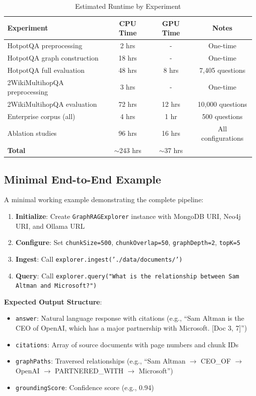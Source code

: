 \documentclass[conference]{IEEEtran}
\begin{document}
\begin{table}[H]
\caption{Estimated Runtime by Experiment}
\label{tab:runtime}
\centering
\begin{tabular}{lccc}
\toprule
\textbf{Experiment} & \textbf{CPU Time} & \textbf{GPU Time} & \textbf{Notes} \\
\midrule
HotpotQA preprocessing & 2 hrs & - & One-time \\
HotpotQA graph construction & 18 hrs & - & One-time \\
HotpotQA full evaluation & 48 hrs & 8 hrs & 7,405 questions \\
2WikiMultihopQA preprocessing & 3 hrs & - & One-time \\
2WikiMultihopQA evaluation & 72 hrs & 12 hrs & 10,000 questions \\
Enterprise corpus (all) & 4 hrs & 1 hr & 500 questions \\
Ablation studies & 96 hrs & 16 hrs & All configurations \\
\midrule
\textbf{Total} & $\sim$243 hrs & $\sim$37 hrs & \\
\bottomrule
\end{tabular}
\end{table}

\subsection{Minimal End-to-End Example}

A minimal working example demonstrating the complete pipeline:

\begin{enumerate}
    \item \textbf{Initialize}: Create \texttt{GraphRAGExplorer} instance with MongoDB URI, Neo4j URI, and Ollama URL
    \item \textbf{Configure}: Set \texttt{chunkSize=500}, \texttt{chunkOverlap=50}, \texttt{graphDepth=2}, \texttt{topK=5}
    \item \textbf{Ingest}: Call \texttt{explorer.ingest('./data/documents/')}
    \item \textbf{Query}: Call \texttt{explorer.query("What is the relationship between Sam Altman and Microsoft?")}
\end{enumerate}

\textbf{Expected Output Structure}:
\begin{itemize}
    \item \texttt{answer}: Natural language response with citations (e.g., ``Sam Altman is the CEO of OpenAI, which has a major partnership with Microsoft. [Doc 3, 7]'')
    \item \texttt{citations}: Array of source documents with page numbers and chunk IDs
    \item \texttt{graphPaths}: Traversed relationships (e.g., ``Sam Altman $\rightarrow$ CEO\_OF $\rightarrow$ OpenAI $\rightarrow$ PARTNERED\_WITH $\rightarrow$ Microsoft'')
    \item \texttt{groundingScore}: Confidence score (e.g., 0.94)
\end{itemize}
\end{document}
